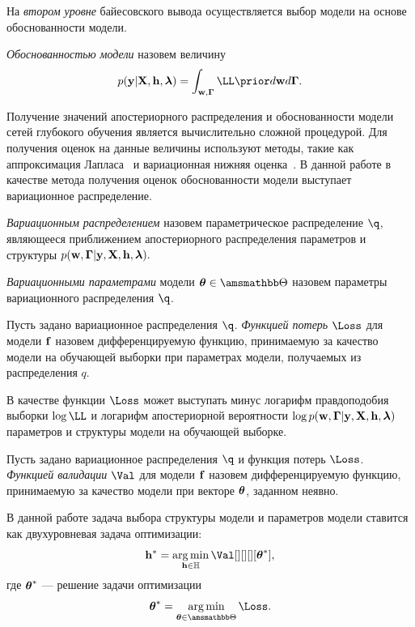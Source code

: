 На \textit{втором уровне} байесовского вывода осуществляется выбор модели на основе обоснованности модели.
\begin{defin}
\textit{Обоснованностью модели }назовем величину
\begin{equation}
\label{eq:evidence}
\EV = \int_{\mathbf{w}, \boldsymbol{\Gamma}} \LL \prior  d\mathbf{w}d\boldsymbol{\Gamma}.
\end{equation}
\end{defin}
Получение значений апостериорного распределения и обоснованности модели сетей глубокого обучения является вычислительно сложной процедурой. Для получения оценок на данные величины используют методы, такие как аппроксимация Лапласа~\cite{tokmakova} и вариационная нижняя оценка~\cite{nips}.  В данной работе в качестве метода получения оценок обоснованности модели выступает вариационное распределение.

\begin{defin}
\textit{Вариационным распределением} назовем параметрическое распределение $\q$, являющееся приближением  апостериорного распределения параметров и структуры $p(\mathbf{w}, \boldsymbol{\Gamma}|\mathbf{y}, \mathbf{X}, \mathbf{h},\boldsymbol{\lambda}).$ 
\end{defin}

\begin{defin}
\textit{Вариационными параметрами} модели $\teta \in \Tetab$ назовем параметры вариационного распределения $\q$.
\end{defin} 

\begin{defin}
\label{def:l}
Пусть задано вариационное распределения $\q$.
\textit{Функцией потерь} $\Loss$ для модели $\mathbf{f}$ назовем дифференцируемую функцию, принимаемую за качество модели на обучающей выборки при параметрах модели, получаемых из  распределения $q$.
\end{defin}

В качестве функции $\Loss$ может выступать минус логарифм правдоподобия выборки $\log\LL$  и логарифм апостериорной вероятности $\log p(\mathbf{w}, \boldsymbol{\Gamma}|\mathbf{y}, \mathbf{X}, \mathbf{h},\boldsymbol{\lambda})$ параметров и структуры модели на обучающей выборке.

\begin{defin}
\label{def:q}
Пусть задано вариационное распределения $\q$ и функция потерь $\Loss$. 
\textit{Функцией валидации} $\Val$ для модели $\mathbf{f}$ назовем дифференцируемую функцию, принимаемую за качество модели при векторе $\boldsymbol{\theta}$, заданном неявно.
\end{defin}

 

В данной работе задача выбора структуры модели и параметров модели ставится как двухуровневая задача оптимизации:
\begin{equation}
\label{eq:optim_problem}
	\h^{*} = \argmin_{\h  \in \Hb} \Val[][][][\teta^{*}],
\end{equation}
где $\boldsymbol{\theta}^{*}$ --- решение задачи оптимизации
\begin{equation}
\label{eq:optim_problem_in}
   \teta^{*} = \argmin_{\teta \in \Tetab} \Loss.
\end{equation}

